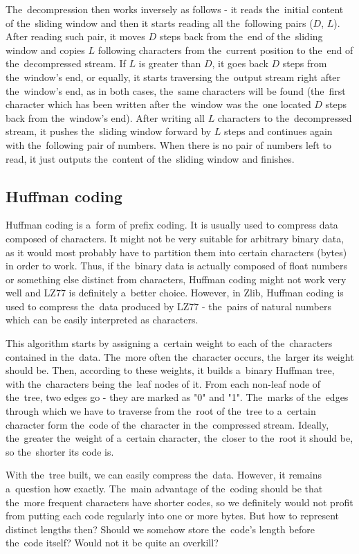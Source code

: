 The~decompression then works inversely as follows - it reads the~initial content of the~sliding window and then it starts reading all the~following pairs ($D$, $L$). After reading such pair, it moves $D$ steps back from the~end of the~sliding window and copies $L$ following characters from the~current position to the~end of the~decompressed stream. If $L$ is greater than $D$, it goes back $D$ steps from the~window's end, or equally, it starts traversing the~output stream right after the~window's end, as in both cases, the~same characters will be found (the~first character which has been written after the~window was the~one located $D$ steps back from the~window's end). After writing all $L$ characters to the~decompressed stream, it pushes the~sliding window forward by $L$ steps and continues again with the~following pair of numbers. When there is no pair of numbers left to read, it just outputs the~content of the~sliding window and finishes.

\subsection{Huffman coding}\label{subsec:huffman}

Huffman coding is a~form of prefix coding. It is usually used to compress data composed of characters. It might not be very suitable for arbitrary binary data, as it would most probably have to partition them into certain characters (bytes) in order to work. Thus, if the~binary data is actually composed of float numbers or something else distinct from characters, Huffman coding might not work very well and LZ77 is definitely a~better choice. However, in Zlib, Huffman coding is used to compress the~data produced by LZ77 - the~pairs of natural numbers which can be easily interpreted as characters.

This algorithm starts by assigning a~certain weight to each of the~characters contained in the~data. The~more often the~character occurs, the~larger its weight should be. Then, according to these weights, it builds a~binary Huffman tree, with the~characters being the~leaf nodes of it. From each non-leaf node of the~tree, two edges go - they are marked as "0" and "1". The~marks of the~edges through which we have to traverse from the~root of the~tree to a~certain character form the~code of the~character in the~compressed stream. Ideally, the~greater the~weight of a~certain character, the~closer to the~root it should be, so the~shorter its code is.

With the~tree built, we can easily compress the~data. However, it remains a~question how exactly. The~main advantage of the~coding should be that the~more frequent characters have shorter codes, so we definitely would not profit from putting each code regularly into one or more bytes. But how to represent distinct lengths then? Should we somehow store the~code's length before the~code itself? Would not it be quite an overkill? 

